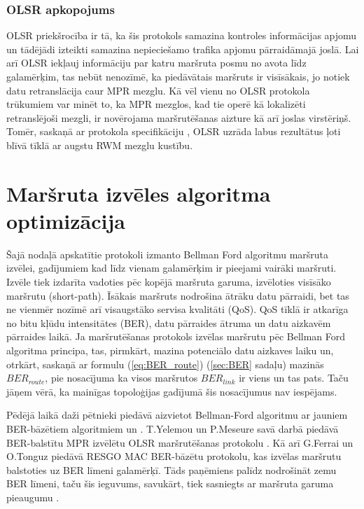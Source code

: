 \subsubsection{OLSR apkopojums}
OLSR priekšrocība ir tā, ka šis protokols samazina kontroles informācijas apjomu un tādējādi izteikti samazina nepieciešamo trafika apjomu pārraidāmajā joslā. Lai arī OLSR iekļauj informāciju par katru maršruta posmu no avota līdz galamērķim, tas nebūt nenozīmē, ka piedāvātais maršruts ir visīsākais, jo notiek datu retranslācija caur MPR mezglu. Kā vēl vienu no OLSR protokola trūkumiem var minēt to, ka MPR mezglos, kad tie operē kā lokalizēti retranslējoši mezgli, ir novērojama maršrutēšanas aizture kā arī joslas virstēriņš. Tomēr, saskaņā ar protokola specifikāciju \cite{rfc3626}, OLSR uzrāda labus rezultātus ļoti blīvā tīklā ar augstu RWM mezglu kustību.

\section{Maršruta izvēles algoritma optimizācija}\label{sec:BERSP}
Šajā nodaļā apskatītie protokoli izmanto Bellman Ford algoritmu maršruta izvēlei, gadījumiem kad līdz vienam galamērķim ir pieejami vairāki maršruti. Izvēle tiek izdarīta vadoties pēc kopējā maršruta garuma, izvēloties visīsāko maršrutu (short-path). Īsākais maršruts nodrošina ātrāku datu pārraidi, bet tas ne vienmēr nozīmē arī visaugstāko servisa kvalitāti (QoS). \acl{QoS} tīklā ir atkarīga no bitu kļūdu intensitātes (\acs{BER}), datu pārraides ātruma un datu aizkavēm pārraides laikā. Ja maršrutēšanas protokols izvēlas maršrutu pēc Bellman Ford algoritma principa, tas, pirmkārt, mazina potenciālo datu aizkaves laiku un, otrkārt, saskaņā ar formulu (\ref{eq:BER_route}) (\seename \ref{sec:BER} sadaļu) mazinās $BER_{route}$, pie nosacījuma ka visos maršrutos $BER_{link}$ ir viens un tas pats. Taču jāņem vērā, ka mainīgas topoloģijas gadījumā šis nosacījumus nav iespējams.

Pēdējā laikā daži pētnieki piedāvā aizvietot Bellman-Ford algoritmu ar jauniem BER-bāzētiem algoritmiem \cite{olsr_ber} un \cite{qoS_static}.  T.Yelemou un P.Meseure savā darbā piedāvā BER-balstītu MPR izvēlētu OLSR maršrutēšanas protokolu \cite{olsr_ber}. Kā arī G.Ferrai un O.Tonguz \cite{qoS_static} piedāvā RESGO MAC BER-bāzētu protokolu, kas izvēlas maršrutu balstoties uz BER līmeni galamērķī. Tāds paņēmiens palīdz nodrošināt zemu BER līmeni, taču šis ieguvums, savukārt, tiek sasniegts ar maršruta garuma pieaugumu \cite{qoS_static}.

